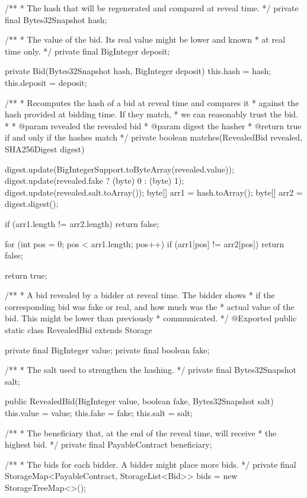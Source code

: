 \begin{codebox}
\begin{javalst}
{{    /**
    * The hash that will be regenerated and compared at reveal time.
    */
    private final Bytes32Snapshot hash;

    /**
    * The value of the bid. Its real value might be lower and known
    * at real time only.
    */
    private final BigInteger deposit;

    private Bid(Bytes32Snapshot hash, BigInteger deposit) {
      this.hash = hash;
      this.deposit = deposit;
    }

    /**
    * Recomputes the hash of a bid at reveal time and compares it
    * against the hash provided at bidding time. If they match,
    * we can reasonably trust the bid.
    * 
    * @param revealed the revealed bid
    * @param digest the hasher
    * @return true if and only if the hashes match
    */
    private boolean matches(RevealedBid revealed, SHA256Digest digest) {
      digest.update(BigIntegerSupport.toByteArray(revealed.value));
      digest.update(revealed.fake ? (byte) 0 : (byte) 1);
      digest.update(revealed.salt.toArray());
      byte[] arr1 = hash.toArray();
      byte[] arr2 = digest.digest();

      if (arr1.length != arr2.length)
        return false;

      for (int pos = 0; pos < arr1.length; pos++)
        if (arr1[pos] != arr2[pos])
          return false;

      return true;
    }
  }

  /**
  * A bid revealed by a bidder at reveal time. The bidder shows
  * if the corresponding bid was fake or real, and how much was the
  * actual value of the bid. This might be lower than previously
  * communicated.
  */
  @Exported
  public static class RevealedBid extends Storage {
    private final BigInteger value;
    private final boolean fake;

    /**
    * The salt used to strengthen the hashing.
    */
    private final Bytes32Snapshot salt;

    public RevealedBid(BigInteger value, boolean fake, Bytes32Snapshot salt) {
      this.value = value;
      this.fake = fake;
      this.salt = salt;
    }
  }

  /**
  * The beneficiary that, at the end of the reveal time, will receive
  * the highest bid.
  */
  private final PayableContract beneficiary;

  /**
  * The bids for each bidder. A bidder might place more bids.
  */
  private final StorageMap<PayableContract, StorageList<Bid>> bids = new StorageTreeMap<>();

}
\end{javalst}
\end{codebox}
